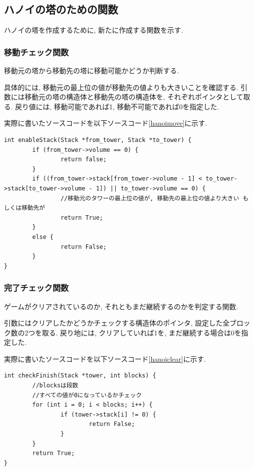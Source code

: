 \documentclass[a4j]{jsarticle}
\begin{document}
    \subsection{ハノイの塔のための関数}
        ハノイの塔を作成するために, 新たに作成する関数を示す. 
        \subsubsection{移動チェック関数}
        移動元の塔から移動先の塔に移動可能かどうか判断する. 
        
        具体的には, 移動元の最上位の値が移動先の値よりも大きいことを確認する. 
        引数には移動元の塔の構造体と移動先の塔の構造体を, それぞれポインタとして取る. 戻り値には, 移動可能であれば1, 移動不可能であれば0を指定した. 
        
        実際に書いたソースコードを以下ソースコード\ref{hanoimove}に示す. 
        \begin{lstlisting}[label = hanoimove, caption = 移動チェック関数]
int enableStack(Stack *from_tower, Stack *to_tower) {
        if (from_tower->volume == 0) {
                return false;
        }
        if ((from_tower->stack[from_tower->volume - 1] < to_tower->stack[to_tower->volume - 1]) || to_tower->volume == 0) {
                //移動元のタワーの最上位の値が, 移動先の最上位の値より大きい もしくは移動先が
                return True;
        }
        else {
                return False;
        }
}
        \end{lstlisting}
        \subsubsection{完了チェック関数}
        ゲームがクリアされているのか, それともまだ継続するのかを判定する関数. 
        
        引数にはクリアしたかどうかチェックする構造体のポインタ, 設定した全ブロック数の2つを取る. 戻り地には, クリアしていれば1を, まだ継続する場合は0を指定した. 
        
        実際に書いたソースコードを以下ソースコード\ref{hanoiclear}に示す. 
        \begin{lstlisting}[label = hanoiclear, caption = 完了チェック関数]
int checkFinish(Stack *tower, int blocks) {
        //blocksは段数
        //すべての値が0になっているかチェック
        for (int i = 0; i < blocks; i++) {
                if (tower->stack[i] != 0) {
                        return False;
                }
        }
        return True;
}
        \end{lstlisting}
        
\end{document}
